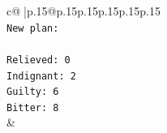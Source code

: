 \documentclass{article}
\begin{document}
{\begin{supertabular}{c@{$\;$}|p{.15\linewidth}@{}p{.15\linewidth}p{.15\linewidth}p{.15\linewidth}p{.15\linewidth}p{.15\linewidth}}
{{{\\ 
\texttt{New plan: } \\
\\ 
\texttt{Relieved: 0} \\
\texttt{Indignant: 2} \\
\texttt{Guilty: 6} \\
\texttt{Bitter: 8} \\
            }
        }
    }
    & \\ \\

\end{supertabular}
}
\end{document}
